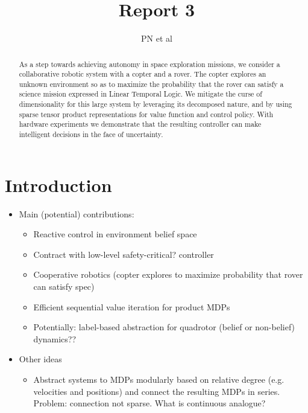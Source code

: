 \documentclass[conference]{IEEEtran}
\begin{document}
\title{\huge Report 3 }

\author{PN et al}

\maketitle

\begin{abstract}
  As a step towards achieving autonomy in space exploration missions, we consider a collaborative robotic system with a copter and a rover. The copter explores an unknown environment so as to maximize the probability that the rover can satisfy a science mission expressed in Linear Temporal Logic. We mitigate the curse of dimensionality for this large system by leveraging its decomposed nature, and by using sparse tensor product representations for value function and control policy. With hardware experiments we demonstrate that the resulting controller can make intelligent decisions in the face of uncertainty.
\end{abstract}

\IEEEpeerreviewmaketitle

	

\section{Introduction}

\begin{itemize}
  \item Main (potential) contributions:
  \begin{itemize}
    \item Reactive control in environment belief space
    \item Contract with low-level safety-critical? controller
    \item Cooperative robotics (copter explores to maximize probability that rover can satisfy spec)
    \item Efficient sequential value iteration for product MDPs
    \item Potentially: label-based abstraction for quadrotor (belief or non-belief) dynamics?? 
  \end{itemize}
  \item Other ideas
  \begin{itemize}
  	\item Abstract systems to MDPs modularly based on relative degree (e.g. velocities and positions) and connect the resulting MDPs in series. Problem: connection not sparse. What is continuous analogue?
  \end{itemize}
\end{itemize}
\end{document}
